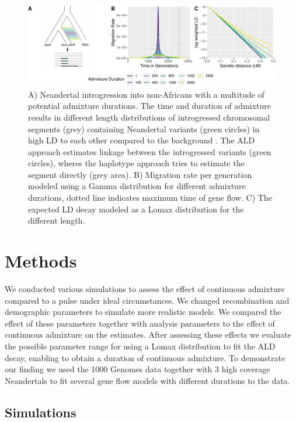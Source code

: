 \documentclass[]{article}
\begin{document}
\begin{figure}
\centering
\includegraphics{Admixture_Time_Inference_Paper_Draft_files/figure-latex/fig1-1.pdf}
\caption{\label{fig:fig1} A) Neandertal introgression into non-Africans with a multitude of potential admixture durations. The time and duration of admixture results in different length distributions of introgressed chromosomal segments (grey) containing  Neandertal variants (green circles)  in high LD to each other
compared to the background . The ALD approach estimates linkage
between the introgressed variants (green circles), wheres the haplotype approach tries
to estimate the segment directly (grey area). B) Migration rate per generation
modeled using a Gamma distribution for different admixture durations,
dotted line indicates maximum time of gene flow. C) The expected LD
decay modeled as a Lomax distribution for the different length.}
\end{figure}

\section{Methods}\label{methods}

We conducted various simulations to assess the effect of continuous
admixture compared to a pulse under ideal circumstances. We changed
recombination and demographic parameters to simulate more realistic
models. We compared the effect of these parameters together with
analysis parameters to the effect of continuous admixture on the
estimates. After assessing these effects we evaluate the possible
parameter range for using a Lomax distribution to fit the ALD decay,
enabling to obtain a duration of continuous admixture. To demonstrate our finding we used the 1000 Genomes data together with 3 high coverage Neandertals to fit several gene flow models with different durations to the data.

\subsection{Simulations}\label{simulations}
\end{document}
